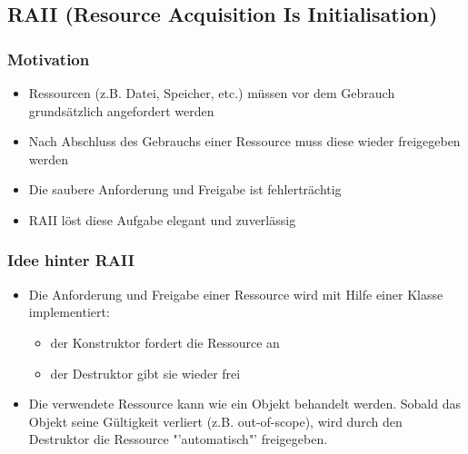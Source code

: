 \subsection{RAII (Resource Acquisition Is Initialisation)}
\subsubsection{Motivation}
\begin{itemize}
  \item Ressourcen (z.B. Datei, Speicher, etc.) müssen vor dem Gebrauch grundsätzlich angefordert werden
  \item Nach Abschluss des Gebrauchs einer Ressource muss diese wieder freigegeben werden
  \item Die saubere Anforderung und Freigabe ist fehlerträchtig
  \item RAII löst diese Aufgabe elegant und zuverlässig
\end{itemize}

\subsubsection{Idee hinter RAII}
\begin{itemize}
  \item Die Anforderung und Freigabe einer Ressource wird mit Hilfe einer Klasse implementiert:
  \begin{itemize}
    \item der Konstruktor fordert die Ressource an
    \item der Destruktor gibt sie wieder frei
  \end{itemize}
  \item Die verwendete Ressource kann wie ein Objekt behandelt werden. Sobald das Objekt seine Gültigkeit verliert (z.B. out-of-scope), wird durch den Destruktor die Ressource "'automatisch"' freigegeben.
\end{itemize}

